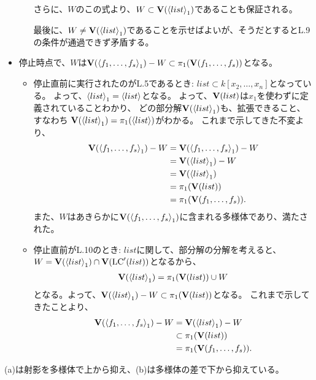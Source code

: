 \documentclass[9pt]{ltjsarticle}
\begin{document}
\begin{myproof}
\begin{itemize}
\begin{itemize}
      さらに、$W$のこの式より、$W \subset \textbf V(\left\langle list \right\rangle_1)$であることも保証される。

      最後に、$W\neq \textbf V(\left\langle list \right\rangle_1)$であることを示せばよいが、そうだとするとL.9の条件が通過できず矛盾する。
    \end{itemize}
    \item 停止時点で、$W$は$\textbf V(\left\langle f_1,\dots,f_s \right\rangle_1)-W \subset \pi_1(\textbf V(f_1,\dots,f_s))$となる。
    \begin{itemize}
      \item 停止直前に実行されたのがL.5であるとき:
      $list\subset k[x_2,\dots,x_n]$となっている。
      よって、$\left\langle list \right\rangle_1 = \left\langle list \right\rangle$となる。
      よって、$\textbf V(list)$は$x_1$を使わずに定義されていることわかり、
      どの部分解$\textbf V(\left\langle list \right\rangle_1)$も、拡張できること、すなわち
      $\textbf V(\left\langle list \right\rangle_1) = \pi_1(\left\langle list \right\rangle)$がわかる。
      これまで示してきた不変より、
      \begin{align}
        \textbf V(\left\langle f_1,\dots,f_s \right\rangle_1)-W
        &=
        \textbf V(\left\langle f_1,\dots,f_s \right\rangle_1)-W\\
        &=
        \textbf V(\left\langle list \right\rangle_1)-W\\
        &=
        \textbf V(\left\langle list \right\rangle_1)\\
        &=
        \pi_1(\textbf V(list))\\
        &=
        \pi_1(\textbf V(f_1,\dots,f_s)).
      \end{align}
      また、$W$はあきらかに$\textbf V(\left\langle f_1,\dots,f_s \right\rangle_1)$に含まれる多様体であり、満たされた。
      \item 停止直前がL.10のとき:
      $list$に関して、部分解の分解を考えると、$W= \textbf V(\left\langle list \right\rangle_1) \cap \textbf V({\rm LC}'(list))$となるから、
      \begin{align}
        \textbf V(\left\langle list \right\rangle_1)
        =
        \pi_1(\textbf V(list)) \cup W
      \end{align}
      となる。よって、$\textbf V(\left\langle list \right\rangle_1)-W\subset \pi_1(\textbf V(list))$となる。
      これまで示してきたことより、
      \begin{align}
        \textbf V(\left\langle f_1,\dots,f_s \right\rangle_1)-W
        &=
        \textbf V(\left\langle list \right\rangle_1)-W\\
        &\subset
        \pi_1(\textbf V(list))\\
        &=
        \pi_1(\textbf V(f_1,\dots,f_s)).
      \end{align}

    \end{itemize}
  \end{itemize}
\end{myproof}
(a)は射影を多様体で上から抑え、(b)は多様体の差で下から抑えている。
\end{document}
